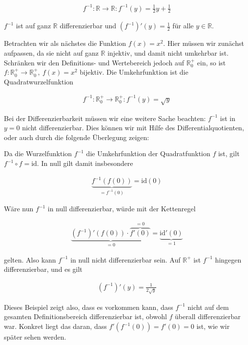 \documentclass[fontsize=9pt,
               parskip=half-,
               DIV=14,
               listof=chapterentry,
               tocflat]{scrbook}
\begin{document}
\begin{align*}
f^{-1}:\mathbb {R} \to \mathbb {R} :f^{-1}(y)={\tfrac {1}{2}}y+{\tfrac {1}{2}}
\end{align*}

$f^{-1}$ ist auf ganz $\mathbb {R} $ differenzierbar und $(f^{-1})'(y)={\frac {1}{2}}$ für alle $y\in \mathbb {R} $.

Betrachten wir als nächstes die Funktion $f(x)=x^{2}$. Hier müssen wir zunächst aufpassen, da sie nicht auf ganz $\mathbb {R} $ injektiv, und damit nicht umkehrbar ist. Schränken wir den Definitions- und Wertebereich jedoch auf $\mathbb {R} _{0}^{+}$ ein, so ist $f:\mathbb {R} _{0}^{+}\to \mathbb {R} _{0}^{+},\ f(x)=x^{2}$ bijektiv. Die Umkehrfunktion ist die Quadratwurzelfunktion

\begin{align*}
f^{-1}:\mathbb {R} _{0}^{+}\to \mathbb {R} _{0}^{+}:f^{-1}(y)={\sqrt {y}}
\end{align*}

Bei der Differenzierbarkeit müssen wir eine weitere Sache beachten: $f^{-1}$ ist in $y=0$ nicht differenzierbar. Dies können wir mit Hilfe des Differentialquotienten, oder auch durch die folgende Überlegung zeigen:

Da die Wurzelfunktion $f^{-1}$ die Umkehrfunktion der Quadratfunktion $f$ ist, gilt $f^{-1}\circ f={\text{id}}$. In null gilt damit insbesondere

\begin{align*}
\underbrace {f^{-1}(f(0))} _{=f^{-1}(0)}={\text{id}}(0)
\end{align*}

Wäre nun $f^{-1}$ in null differenzierbar, würde mit der Kettenregel

\begin{align*}
\underbrace {(f^{-1})'(f(0))\cdot \overbrace {f'(0)} ^{=0}} _{=0}=\underbrace {{\text{id}}'(0)} _{=1}
\end{align*}

gelten. Also kann $f^{-1}$ in null nicht differenzierbar sein. Auf $\mathbb {R} ^{+}$ ist $f^{-1}$ hingegen differenzierbar, und es gilt

\begin{align*}
(f^{-1})'(y)={\tfrac {1}{2{\sqrt {y}}}}
\end{align*}

Dieses Beispiel zeigt also, dass es vorkommen kann, dass $f^{-1}$ nicht auf dem gesamten Definitionsbereich differenzierbar ist, obwohl $f$ überall differenzierbar war. Konkret liegt das daran, dass $f'(f^{-1}(0))=f'(0)=0$ ist, wie wir später sehen werden.
\end{document}
